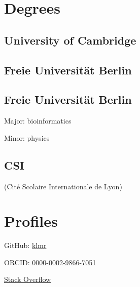 \documentclass{klmr-cv}
\author{Konrad Rudolph}
\begin{document}
\maketitle

\sidebar

\section{Degrees}

\subsection{University of Cambridge}

\date{2011--now}
\item{}

\subsection{Freie Universität Berlin}

\date{2011}
\item{}

\subsection{Freie Universität Berlin}

\date{2008}
\item{}
\item{Major: bioinformatics}
\item{Minor: physics}

\subsection{CSI}

\item{(Cité Scolaire Internationale de Lyon)}
\date{2003}
\item{}

\section{Profiles}

\item{GitHub: \href{http://github.com/klmr}{klmr}}
\item{ORCID:
    {\footnotesize\href{http://orcid.org/0000-0002-9866-7051}{0000-0002-9866-7051}}}
\item{\href{http://stackoverflow.com/users/1968/konrad-rudolph}{Stack Overflow}}
\end{document}
